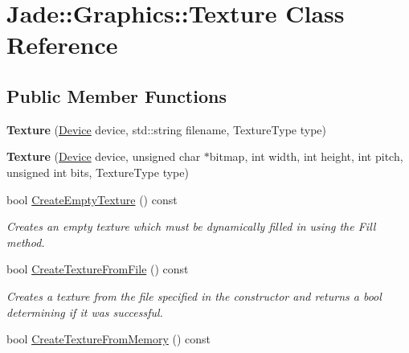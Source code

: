 \hypertarget{class_jade_1_1_graphics_1_1_texture}{}\section{Jade\+:\+:Graphics\+:\+:Texture Class Reference}
\label{class_jade_1_1_graphics_1_1_texture}
\subsection*{Public Member Functions}
\begin{DoxyCompactItemize}
\item 
\hypertarget{class_jade_1_1_graphics_1_1_texture_a59de955b57a5db4845792cef4c9959d9}{}{\bfseries Texture} (\hyperlink{class_jade_1_1_graphics_1_1_device}{Device} device, std\+::string filename, Texture\+Type type)\label{class_jade_1_1_graphics_1_1_texture_a59de955b57a5db4845792cef4c9959d9}

\item 
\hypertarget{class_jade_1_1_graphics_1_1_texture_a3c83a491d69caebc7f8c4bcfb9c36e73}{}{\bfseries Texture} (\hyperlink{class_jade_1_1_graphics_1_1_device}{Device} device, unsigned char $\ast$bitmap, int width, int height, int pitch, unsigned int bits, Texture\+Type type)\label{class_jade_1_1_graphics_1_1_texture_a3c83a491d69caebc7f8c4bcfb9c36e73}

\item 
\hypertarget{class_jade_1_1_graphics_1_1_texture_a15e2e2508977986498e05d6d80a5b29b}{}bool \hyperlink{class_jade_1_1_graphics_1_1_texture_a15e2e2508977986498e05d6d80a5b29b}{Create\+Empty\+Texture} () const \label{class_jade_1_1_graphics_1_1_texture_a15e2e2508977986498e05d6d80a5b29b}

\begin{DoxyCompactList}\small\item\em Creates an empty texture which must be dynamically filled in using the Fill method. \end{DoxyCompactList}\item 
\hypertarget{class_jade_1_1_graphics_1_1_texture_aba04918ff5aff35169ebfe6fdeac6727}{}bool \hyperlink{class_jade_1_1_graphics_1_1_texture_aba04918ff5aff35169ebfe6fdeac6727}{Create\+Texture\+From\+File} () const \label{class_jade_1_1_graphics_1_1_texture_aba04918ff5aff35169ebfe6fdeac6727}

\begin{DoxyCompactList}\small\item\em Creates a texture from the file specified in the constructor and returns a bool determining if it was successful. \end{DoxyCompactList}\item 
\hypertarget{class_jade_1_1_graphics_1_1_texture_a2a164bec6f93fe2c905b7b962cee5682}{}bool \hyperlink{class_jade_1_1_graphics_1_1_texture_a2a164bec6f93fe2c905b7b962cee5682}{Create\+Texture\+From\+Memory} () const \label{class_jade_1_1_graphics_1_1_texture_a2a164bec6f93fe2c905b7b962cee5682}


\end{DoxyCompactItemize}
